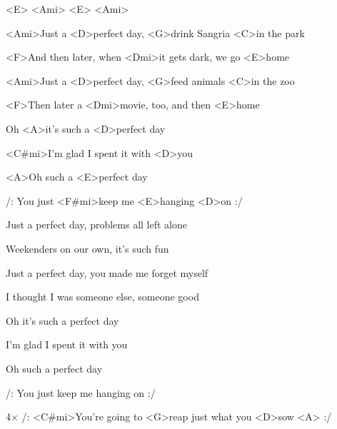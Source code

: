



<E> <Ami> <E> <Ami>

\zs

<Ami>Just a <D>perfect day,
<G>drink Sangria <C>in the park

<F>And then later, when <Dmi>it gets dark,
we go <E>home

<Ami>Just a <D>perfect day,
<G>feed animals <C>in the zoo

<F>Then later a <Dmi>movie, too,
and then <E>home

\bigskip

Oh <A>it's such a <D>perfect day

<C#mi>I'm glad I spent it with <D>you

<A>Oh such a <E>perfect day

/: You just <F#mi>keep me <E>hanging <D>on :/
\ks


\zs
Just a perfect day,
problems all left alone

Weekenders on our own,
it's such fun

Just a perfect day,
you made me forget myself

I thought I was someone else,
someone good

\bigskip

Oh it's such a perfect day

I'm glad I spent it with you

Oh such a perfect day

/: You just keep me hanging on :/
\ks


4× /:
<C#mi>You're going to <G>reap just what you <D>sow <A>
:/


\kp
